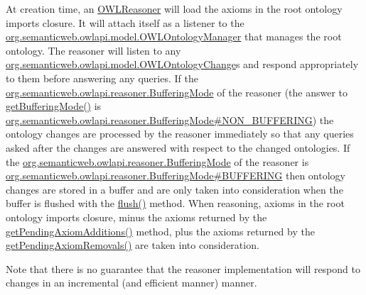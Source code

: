 At creation time, an \hyperlink{interfaceorg_1_1semanticweb_1_1owlapi_1_1reasoner_1_1_o_w_l_reasoner}{O\-W\-L\-Reasoner} will load the axioms in the root ontology imports closure. It will attach itself as a listener to the \hyperlink{interfaceorg_1_1semanticweb_1_1owlapi_1_1model_1_1_o_w_l_ontology_manager}{org.\-semanticweb.\-owlapi.\-model.\-O\-W\-L\-Ontology\-Manager} that manages the root ontology. The reasoner will listen to any \hyperlink{classorg_1_1semanticweb_1_1owlapi_1_1model_1_1_o_w_l_ontology_change}{org.\-semanticweb.\-owlapi.\-model.\-O\-W\-L\-Ontology\-Change}s and respond appropriately to them before answering any queries. If the \hyperlink{enumorg_1_1semanticweb_1_1owlapi_1_1reasoner_1_1_buffering_mode}{org.\-semanticweb.\-owlapi.\-reasoner.\-Buffering\-Mode} of the reasoner (the answer to \hyperlink{interfaceorg_1_1semanticweb_1_1owlapi_1_1reasoner_1_1_o_w_l_reasoner_a6a8ee6eda3b5bd2c2bb48354c1fa5d92}{get\-Buffering\-Mode()} is \hyperlink{enumorg_1_1semanticweb_1_1owlapi_1_1reasoner_1_1_buffering_mode_ab07dceb7cab753a700819c0dbfabe87c}{org.\-semanticweb.\-owlapi.\-reasoner.\-Buffering\-Mode\#\-N\-O\-N\-\_\-\-B\-U\-F\-F\-E\-R\-I\-N\-G}) the ontology changes are processed by the reasoner immediately so that any queries asked after the changes are answered with respect to the changed ontologies. If the \hyperlink{enumorg_1_1semanticweb_1_1owlapi_1_1reasoner_1_1_buffering_mode}{org.\-semanticweb.\-owlapi.\-reasoner.\-Buffering\-Mode} of the reasoner is \hyperlink{enumorg_1_1semanticweb_1_1owlapi_1_1reasoner_1_1_buffering_mode_afb4c0fc2e7e437308a2c0cd6223b1b02}{org.\-semanticweb.\-owlapi.\-reasoner.\-Buffering\-Mode\#\-B\-U\-F\-F\-E\-R\-I\-N\-G} then ontology changes are stored in a buffer and are only taken into consideration when the buffer is flushed with the \hyperlink{interfaceorg_1_1semanticweb_1_1owlapi_1_1reasoner_1_1_o_w_l_reasoner_ad2d99b8530c4b07c34ff11fdc02a8979}{flush()} method. When reasoning, axioms in the root ontology imports closure, minus the axioms returned by the \hyperlink{interfaceorg_1_1semanticweb_1_1owlapi_1_1reasoner_1_1_o_w_l_reasoner_af1eaa30a1a5a96e7702666ba9b57b39b}{get\-Pending\-Axiom\-Additions()} method, plus the axioms returned by the \hyperlink{interfaceorg_1_1semanticweb_1_1owlapi_1_1reasoner_1_1_o_w_l_reasoner_ae1d4e62a022475acab83d4e6e1871e25}{get\-Pending\-Axiom\-Removals()} are taken into consideration. 

Note that there is no guarantee that the reasoner implementation will respond to changes in an incremental (and efficient manner) manner. 

